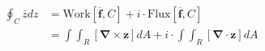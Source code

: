 \documentclass[preview]{standalone}
\begin{document}
\begin{center}
\begin{align*} \oint_{C} \bar{z} dz &= \text{Work}\left[ \boldsymbol{\overline{f}}, C \right] + i \cdot \text{Flux}\left[ \boldsymbol{\overline{f}}, C \right] \\ &= \int\int_{R} \left[ \mathbf{\nabla} \times \mathbf{z} \right] dA +  i \cdot \int\int_{R} \left[ \mathbf{\nabla} \cdot \mathbf{z} \right] dA\\ \end{align*}
\end{center}
\end{document}
